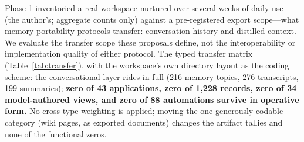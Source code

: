 \documentclass[11pt]{article}
\begin{document}
Phase 1 inventoried a real workspace nurtured over several weeks of daily use
(the author's; aggregate counts only) against a pre-registered export
scope---what memory-portability protocols transfer: conversation history and
distilled context. We evaluate the transfer scope these proposals define, not
the interoperability or implementation quality of either protocol. The typed
transfer matrix (Table~\ref{tab:transfer}), with the workspace's own directory
layout as the coding scheme: the conversational layer rides in full (216 memory
topics, 276 transcripts, 199 summaries); \textbf{zero of 43 applications, zero
of 1,228 records, zero of 34 model-authored views, and zero of 88 automations
survive in operative form.} No cross-type weighting is applied; moving the one
generously-codable category (wiki pages, as exported documents) changes the
artifact tallies and none of the functional zeros.
\end{document}
